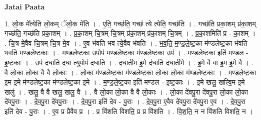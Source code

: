 \documentclass[17pt]{extarticle}
\begin{document}
\textbf{Jatai Paata} \newline

1. लो॒क मे᳚त्येति लो॒कम् ॅलो॒क मे॑ति । . ए॒ति॒ गच्छ॑ति॒ गच्छ॑ त्ये त्येति॒ गच्छ॑ति । . गच्छ॑ति प्रका॒शम् प्र॑का॒शम् गच्छ॑ति॒ गच्छ॑ति प्रका॒शम् । . प्र॒का॒शम् चि॒त्रम् चि॒त्रम् प्र॑का॒शम् प्र॑का॒शम् चि॒त्रम् । . प्र॒का॒शमिति॑ प्र - का॒शम् । . चि॒त्र मे॒वैव चि॒त्रम् चि॒त्र मे॒व । . ए॒व भ॑वति भव त्ये॒वैव भ॑वति । . भ॒व॒ति॒ म॒ण्ड॒ले॒ष्ट॒का म॑ण्डलेष्ट॒का भ॑वति भवति मण्डलेष्ट॒काः । . म॒ण्ड॒ले॒ष्ट॒का उपोप॑ मण्डलेष्ट॒का म॑ण्डलेष्ट॒का उप॑ । . म॒ण्ड॒ले॒ष्ट॒का इति॑ मण्डल - इ॒ष्ट॒काः । . उप॑ दधाति दधा॒ त्युपोप॑ दधाति । . द॒धा॒ती॒म इ॒मे द॑धाति दधाती॒मे । . इ॒मे वै वा इ॒म इ॒मे वै । . वै लो॒का लो॒का वै वै लो॒काः । . लो॒का म॑ण्डलेष्ट॒का म॑ण्डलेष्ट॒का लो॒का लो॒का म॑ण्डलेष्ट॒काः । . म॒ण्ड॒ले॒ष्ट॒का इ॒म इ॒मे म॑ण्डलेष्ट॒का म॑ण्डलेष्ट॒का इ॒मे । . म॒ण्ड॒ले॒ष्ट॒का इति॑ मण्डल - इ॒ष्ट॒काः । . इ॒मे खलु॒ खल्वि॒म इ॒मे खलु॑ । . खलु॒ वै वै खलु॒ खलु॒ वै । . वै लो॒का लो॒का वै वै लो॒काः । . लो॒का दे॑वपु॒रा दे॑वपु॒रा लो॒का लो॒का दे॑वपु॒राः । . दे॒व॒पु॒रा दे॑वपु॒राः । . दे॒व॒पु॒रा इति॑ देव - पु॒राः । . दे॒व॒पु॒रा ए॒वैव दे॑वपु॒रा दे॑वपु॒रा ए॒व । . दे॒व॒पु॒रा इति॑ देव - पु॒राः । . ए॒व प्र प्रैवैव प्र । . प्र वि॑शति विशति॒ प्र प्र वि॑शति । . वि॒श॒ति॒ न न वि॑शति विशति॒ न । \newline
\end{document}
